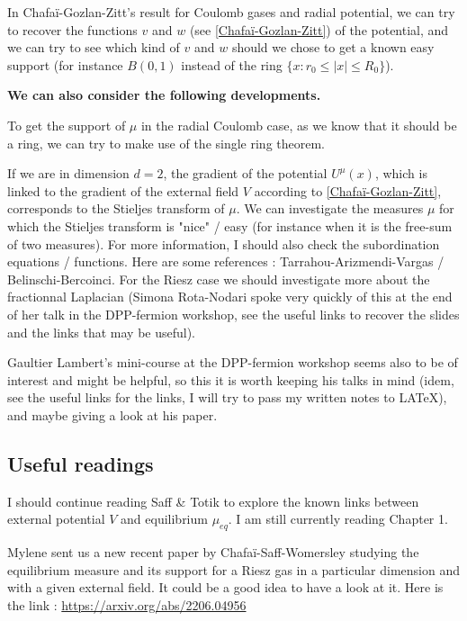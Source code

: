 \documentclass[a4paper,12pt]{report}
\begin{document}
In Chafaï-Gozlan-Zitt's result for Coulomb gases and radial potential, we can try to recover the functions $v$ and $w$ (see \ref{Chafaï-Gozlan-Zitt}) of the potential, and we can try to see which kind of $v$ and $w$ should we chose to get a known easy support (for instance $B(0, 1)$ instead of the ring $\{x : r_0 \leq |x| \leq R_0\}$).
\vspace{0.5cm}

\textbf{We can also consider the following developments.}
\vspace{0.5cm}

To get the support of $\mu$ in the radial Coulomb case, as we know that it should be a ring, we can try to make use of the single ring theorem.
\vspace{0.5cm}

If we are in dimension $d = 2$, the gradient of the potential $U^{\mu}(x)$, which is linked to the gradient of the external field $V$ according to \ref{Chafaï-Gozlan-Zitt},  corresponds to the Stieljes transform of $\mu$. We can investigate the measures $\mu$ for which the Stieljes transform is "nice" / easy (for instance when it is the free-sum of two measures). For more information, I should also check the subordination equations / functions. Here are some references : Tarrahou-Arizmendi-Vargas / Belinschi-Bercoinci. For the Riesz case we should investigate more about the fractionnal Laplacian (Simona Rota-Nodari spoke very quickly of this at the end of her talk in the DPP-fermion workshop, see the useful links to recover the slides and the links that may be useful).
\vspace{0.5cm}

Gaultier Lambert's mini-course at the DPP-fermion workshop seems also to be of interest and might be helpful, so this it is worth keeping his talks in mind (idem, see the useful links for the links, I will try to pass my written notes to LATeX), and maybe giving a look at his paper.



\subsection*{Useful readings}

I should continue reading Saff \& Totik \cite{saff-totik} to explore the known links between external potential $V$ and equilibrium $\mu_{eq}$. I am still currently reading Chapter 1.
\vspace{0.5cm}

Mylene sent us a new recent paper by Chafaï-Saff-Womersley \cite{chafai-saff-womersley} studying the equilibrium measure and its support for a Riesz gas in a particular dimension and with a given external field. It could be a good idea to have a look at it. Here is the link : \href{https://arxiv.org/abs/2206.04956}{https://arxiv.org/abs/2206.04956}
\end{document}

